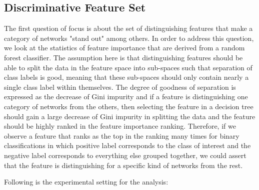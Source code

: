 \documentclass{article}
\begin{document}
\subsection{Discriminative Feature Set}
The first question of focus is about the set of distinguishing features that make a category of networks "stand out" among others. In order to address this question, we look at the 
 statistics of feature importance that are derived from a random forest classifier. The assumption here is that distinguishing features should be able to split the data in the feature space into sub-spaces such that separation of class labels is good, meaning that these sub-spaces should only contain nearly a single class label within themselves. The degree of goodness of separation is expressed as the decrease of Gini impurity and if a feature is distinguishing one category of networks from the others, then selecting the feature in a decision tree should gain a large decrease of Gini impurity in splitting the data and the feature should be highly ranked in the feature importance ranking. Therefore, if we observe a feature that ranks as the top in the ranking many times for binary classifications in which positive label corresponds to the class of interest and the negative label corresponds to everything else grouped together, we could assert that the feature is distinguishing for a specific kind of networks from the rest. 
 
 Following is the experimental setting for the analysis: 
\end{document}

